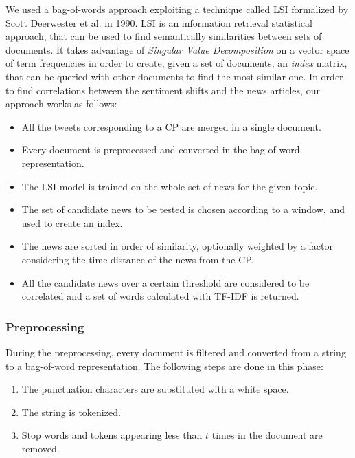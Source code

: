 We used a bag-of-words approach exploiting a technique called LSI formalized by Scott Deerwester et al. in 1990\cite{LSA}. LSI is an information retrieval statistical approach, that can be used to find semantically similarities between sets of documents. It takes advantage of \emph{Singular Value Decomposition} on a vector space of term frequencies in order to create, given a set of documents, an \emph{index} matrix, that can be queried with other documents to find the most similar one. In order to find correlations between the sentiment shifts and the news articles, our approach works as follows:
\begin{itemize}
\item All the tweets corresponding to a CP are merged in a single document.
\item Every document is preprocessed and converted in the bag-of-word representation.
\item The LSI model is trained on the whole set of news for the given topic.
\item The set of candidate news to be tested is chosen according to a window, and  used to create an index.
\item The news are sorted in order of similarity, optionally weighted by a factor considering the time distance of the news from the CP.
\item All the candidate news over a certain threshold are considered to be correlated and a set of words calculated with TF-IDF is returned.
\end{itemize}

\subsubsection*{Preprocessing}
During the preprocessing, every document is filtered and converted from a string to a bag-of-word representation. The following steps are done in this phase:
\begin{enumerate}
\item The punctuation characters are substituted with a white space.
\item The string is tokenized.
\item Stop words and tokens appearing less than $t$ times in the document are removed.
\end{enumerate}


